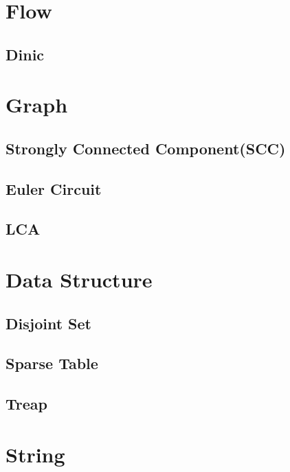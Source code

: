 \documentclass[10pt,twocolumn,oneside]{article}
\begin{document}
\section{Flow}

\subsection{Dinic}


\section{Graph}

\subsection{Strongly Connected Component(SCC)}

\subsection{Euler Circuit}



\subsection{LCA}


\section{Data Structure}

\subsection{Disjoint Set}

\subsection{Sparse Table}

\subsection{Treap}


\section{String}
\end{document}
